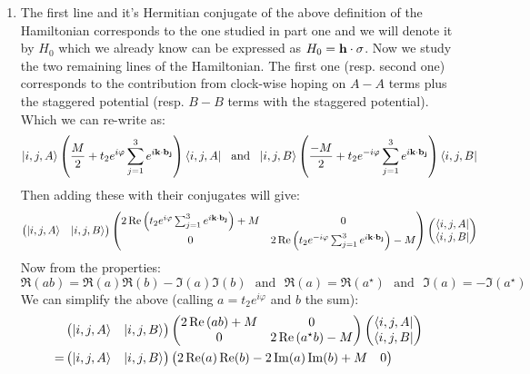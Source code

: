 \documentclass[10pt,a4paper]{article}
\begin{document}
\begin{enumerate}
\item The first line and it's Hermitian conjugate of the above definition of the Hamiltonian corresponds to the one studied in part one and we will denote it by $H_0$ which we already know can be expressed as $H_0 = \vb{h} \cdot \vb{\sigma}$. Now we study the two remaining lines of the Hamiltonian. The first one (resp. second one) corresponds to the contribution from clock-wise hoping on $A-A$ terms plus the staggered potential (resp. $B-B$ terms with the staggered potential). Which we can re-write as:
\[
\ket{i,j, A} \left(\frac{M}{2} + t_2 e^{i\varphi} \sum_{j = 1}^3 e^{i \vb{k} \cdot \vb{b_j}}\right) \bra{i, j, A} \mbox{~~and~~} \ket{i, j, B} \left(\frac{-M}{2} + t_2 e^{-i \varphi} \sum_{j = 1}^3 e^{i \vb{k} \cdot \vb{b_j}} \right)\bra{i, j, B}
\]
Then adding these with their conjugates will give:
\[
\begin{pmatrix}
\ket{i, j, A} & \ket{i, j, B}
\end{pmatrix} \begin{pmatrix}
2 \Re\left( t_2 e^{i \varphi} \sum_{j = 1}^3 e^{i \vb{k} \cdot \vb{b_j}} \right) + M & 0\\
0 & 2 \Re\left( t_2 e^{-i\varphi} \sum_{j = 1}^3 e^{i \vb{k} \cdot \vb{b_j}} \right) - M
\end{pmatrix}
\begin{pmatrix}
\bra{i, j, A}\\
\bra{i, j, B}
\end{pmatrix}
\]
Now from the properties:
\[
\Re(a b) = \Re(a)\Re(b) - \Im(a)\Im(b) \mbox{~~and~~} \Re(a) = \Re(a^\star) \mbox{~~and~~} \Im(a) = -\Im(a^\star)
\]
We can simplify the above (calling $a = t_2e^{i \varphi}$ and $b$ the sum):
\begin{align*}
&\begin{pmatrix}
\ket{i, j, A} & \ket{i, j, B}
\end{pmatrix} \begin{pmatrix}
2 \Re\left( ab \right) + M & 0\\
0 & 2 \Re\left( a^\star b \right) - M
\end{pmatrix}
\begin{pmatrix}
\bra{i, j, A}\\
\bra{i, j, B}
\end{pmatrix}
\\
=
&\begin{pmatrix}
\ket{i, j, A} & \ket{i, j, B}
\end{pmatrix} \begin{pmatrix}
2 \Re(a)\Re(b) - 2 \Im(a) \Im(b) + M & 0\\

\end{pmatrix}
\end{align*}
\end{enumerate}
\end{document}
